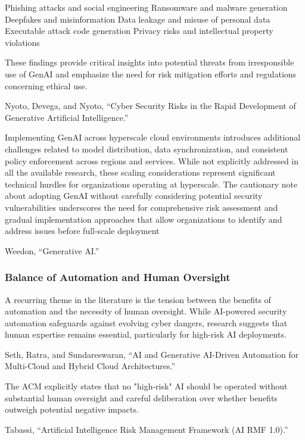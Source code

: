 Phishing attacks and social engineering
Ransomware and malware generation
Deepfakes and misinformation
Data leakage and misuse of personal data
Executable attack code generation
Privacy risks and intellectual property violations

These findings provide critical insights into potential threats from irresponsible use of GenAI and emphasize the need for risk mitigation efforts and regulations concerning ethical use.

Nyoto, Devega, and Nyoto, “Cyber Security Risks in the Rapid Development of Generative Artificial Intelligence.”

Implementing GenAI across hyperscale cloud environments introduces additional challenges related to model distribution, data synchronization, and consistent policy enforcement across regions and services. While not explicitly addressed in all the available research, these scaling considerations represent significant technical hurdles for organizations operating at hyperscale.
The cautionary note about adopting GenAI without carefully considering potential security vulnerabilities underscores the need for comprehensive risk assessment and gradual implementation approaches that allow organizations to identify and address issues before full-scale deployment

Weedon, “Generative AI.”


\subsubsection{Balance of Automation and Human Oversight} %
\label{sec:Balance of Automation and Human Oversight}

A recurring theme in the literature is the tension between the benefits of automation and the necessity of human oversight. While AI-powered security automation safeguards against evolving cyber dangers, research suggests that human expertise remains essential, particularly for high-risk AI deployments.

Seth, Ratra, and Sundareswaran, “AI and Generative AI-Driven Automation for Multi-Cloud and Hybrid Cloud Architectures.”

The ACM explicitly states that no "high-risk" AI should be operated without substantial human oversight and careful deliberation over whether benefits outweigh potential negative impacts.

Tabassi, “Artificial Intelligence Risk Management Framework (AI RMF 1.0).”

